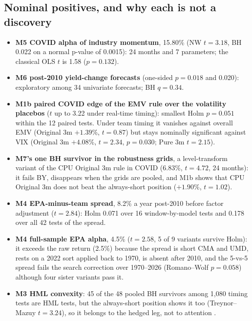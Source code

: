 \begin{table}[H]
\caption{Final verdict by candidate. No candidate reaches ``implement''; the optimizer book moves to paper-trading, and the report's verdict stays ``Do not implement''.}
\label{tab:m7verdict}
\centering\footnotesize

\end{table}

\subsection{Nominal positives, and why each is not a discovery}
\begin{itemize}
\item \textbf{M5 COVID alpha of industry momentum}, 15.80\% (NW $t=3.18$, BH 0.022 on a normal p-value of 0.0015): 24 months and 7 parameters; the classical OLS $t$ is 1.58 ($p=0.132$).
\item \textbf{M6 post-2010 yield-change forecasts} (one-sided $p=0.018$ and 0.020): exploratory among 34 univariate forecasts; BH $q=0.34$.
\item \textbf{M1b paired COVID edge of the EMV rule over the volatility placebos} ($t$ up to 3.22 under real-time timing): smallest Holm $p=0.051$ within the 12 paired tests. Under team timing it vanishes against overall EMV (Original 3m $+1.39$\%, $t=0.87$) but stays nominally significant against VIX (Original 3m $+4.08$\%, $t=2.34$, $p=0.030$; Pure 3m $t=2.15$).
\item \textbf{M7's one BH survivor in the robustness grids}, a level-transform variant of the CPU Original 3m rule in COVID (6.83\%, $t=4.72$, 24 months): it fails BY, disappears when the grids are pooled, and M1b shows that CPU Original 3m does not beat the always-short position ($+1.90$\%, $t=1.02$).
\item \textbf{M4 EPA-minus-team spread}, 8.2\% a year post-2010 before factor adjustment ($t=2.84$): Holm 0.071 over 16 window-by-model tests and 0.178 over all 42 tests of the spread.
\item \textbf{M4 full-sample EPA alpha}, 4.5\% ($t=2.58$, 5 of 9 variants survive Holm): it exceeds the raw return (2.5\%) because the spread is short CMA and UMD, rests on a 2022 sort applied back to 1970, is absent after 2010, and the 5-vs-5 spread fails the search correction over 1970--2026 (Romano--Wolf $p=0.058$) although four sister variants pass it.
\item \textbf{M3 HML convexity}: 45 of the 48 pooled BH survivors among 1,080 timing tests are HML tests, but the always-short position shows it too (Treynor--Mazuy $t=3.24$), so it belongs to the hedged leg, not to attention \citep{tm1966,hm1981}.
\end{itemize}



